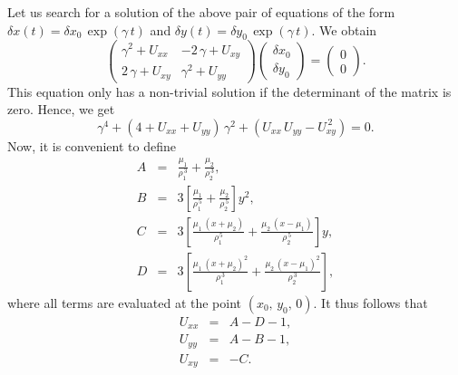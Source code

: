 Let us search for a solution of the above pair of equations
of the form $\delta x(t) = \delta x_0\,\exp(\gamma\,t)$ and
$\delta y(t) = \delta y_0\,\exp(\gamma\,t)$. We obtain
\begin{equation}
\left(
\begin{array}{cc}
\gamma^2 + U_{xx}& -2\,\gamma+U_{xy}\\[0.5ex]
2\,\gamma + U_{xy}& \gamma^2+ U_{yy}
\end{array}
\right)
\left(
\begin{array}{c}
\delta x_0\\[0.5ex]
\delta y_0
\end{array}
\right) = \left(
\begin{array}{c}
 0\\[0.5ex]
 0
\end{array}
\right).
\end{equation}
This equation only has a non-trivial solution if the determinant of the
matrix is zero. Hence, we get
\begin{equation}\label{e14.75}
\gamma^4 + (4+U_{xx}+U_{yy})\,\gamma^2 + (U_{xx}\,U_{yy}-U_{xy}^{\,2}) = 0.
\end{equation}
Now, it is convenient to define
\begin{eqnarray}
A &=& \frac{\mu_1}{\rho_1^{\,3}} + \frac{\mu_2}{\rho_2^{\,3}},\\[0.5ex]
B &=& 3\left[ \frac{\mu_1}{\rho_1^{\,5}} + \frac{\mu_2}{\rho_2^{\,5}}\right]y^2,\\[0.5ex]
C &=& 3\left[\frac{\mu_1\,(x+\mu_2)}{\rho_1^{\,5}}+\frac{\mu_2\,(x-\mu_1)}{\rho_2^{\,5}}\right]y,\\[0.5ex]
D &=& 3\left[\frac{\mu_1\,(x+\mu_2)^2}{\rho_1^{\,3}}+\frac{\mu_2\,(x-\mu_1)^2}{\rho_2^{\,3}}\right],
\end{eqnarray}
where all terms are evaluated at the point $(x_0,\,y_0,\,0)$. It thus follows that
\begin{eqnarray}
U_{xx} &=& A - D - 1,\\[0.5ex]
U_{yy} &=& A - B - 1,\\[0.5ex]
U_{xy} &=& - C.
\end{eqnarray}

